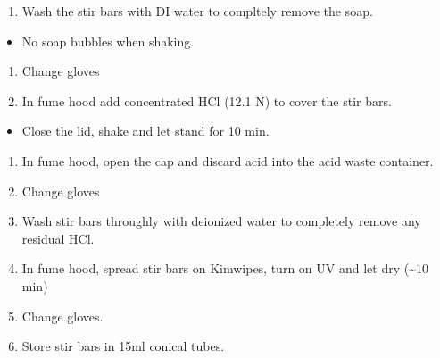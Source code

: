 \documentclass[]{article}
\providecommand{\tightlist}{%
  \setlength{\itemsep}{0pt}\setlength{\parskip}{0pt}}
\begin{document}
\begin{enumerate}
\def\labelenumi{\arabic{enumi}.}
\setcounter{enumi}{1}
\tightlist
\item
  Wash the stir bars with DI water to compltely remove the soap.
\end{enumerate}

\begin{itemize}
\tightlist
\item
  No soap bubbles when shaking.
\end{itemize}

\begin{enumerate}
\def\labelenumi{\arabic{enumi}.}
\setcounter{enumi}{2}
\tightlist
\item
  Change gloves
\item
  In fume hood add concentrated HCl (12.1 N) to cover the stir bars.
\end{enumerate}

\begin{itemize}
\tightlist
\item
  Close the lid, shake and let stand for 10 min.
\end{itemize}

\begin{enumerate}
\def\labelenumi{\arabic{enumi}.}
\setcounter{enumi}{3}
\tightlist
\item
  In fume hood, open the cap and discard acid into the acid waste
  container.
\item
  Change gloves
\item
  Wash stir bars throughly with deionized water to completely remove any
  residual HCl.
\item
  In fume hood, spread stir bars on Kimwipes, turn on UV and let dry
  (\textasciitilde{}10 min)
\item
  Change gloves.
\item
  Store stir bars in 15ml conical tubes.
\end{enumerate}
\end{document}

